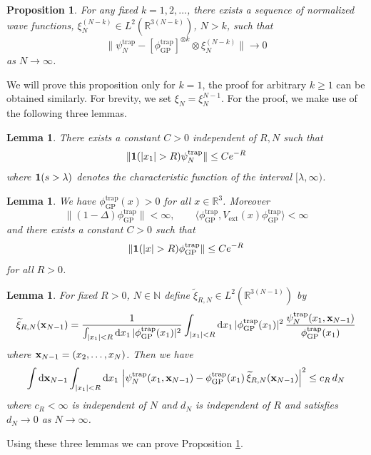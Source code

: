 \documentclass[11pt]{article}
\newtheorem{proposition}[theorem]{Proposition}
\newtheorem{lemma}[theorem]{Lemma}
\newcommand{\rd}{{\rm d}}
\newcommand{\Vtrap}{V_{\text{ext}}}
\newcommand{\psitrap}{\psi_N^{\text{trap}}}
\newcommand{\phitrap}{\phi_{\text{GP}}^{\text{trap}}}
\newcommand{\bx}{{\bf x}}
\newcommand{\bR}{{\mathbb R}}
\newcommand{\bN}{{\mathbb N}}
\newcommand{\wt}{\widetilde}
\begin{document}
\begin{proposition}\label{prop:C1} For any fixed $k=1,2,\ldots $,
there exists a sequence of normalized wave functions,
$\xi_N^{(N-k)} \in L^2 (\bR^{3(N-k)})$,  $N> k$, such that
\[ \big\| \psitrap - [\phitrap]^{\otimes k} \otimes \xi_N^{(N-k)}
 \big\| \to 0 \] as $N \to
\infty$.
\end{proposition}

We will prove this proposition only for $k=1$, the proof
for arbitrary $k\ge 1$ can be obtained similarly. For brevity,
we set $\xi_N= \xi_N^{N-1}$.
For the proof, we make use of the following three lemmas.

\begin{lemma}\label{lm:C1}
There exists a constant $C >0$ independent of $R,N$ such that
\begin{equation}
\| {\bf 1}(|x_1| > R ) \psitrap \| \leq C e^{-R}
\end{equation}
where ${\bf 1} (s > \lambda)$ denotes the characteristic function of
the interval $[\lambda , \infty)$.
\end{lemma}

\begin{lemma}\label{lm:C2}
We have $\phitrap (x) > 0$ for all $x \in \bR^3$. Moreover
\[ \| (1 -\Delta) \phitrap \| < \infty , \qquad  \langle \phitrap, \Vtrap (x) \phitrap \rangle
< \infty \] and there exists a constant $C>0$ such that
\[ \| {\bf 1} (|x| > R ) \phitrap \| \leq C e^{-R} \] for all $R >0$.
\end{lemma}

\begin{lemma}\label{lm:C3}
For fixed $R>0$, $N \in \bN$ define $\wt\xi_{R,N} \in L^2
(\bR^{3(N-1)})$ by
\[ \wt\xi_{R,N} (\bx_{N-1}) = \frac{1}{\int_{|x_1| < R} \rd
x_1 \, |\phitrap (x_1)|^2} \int_{|x_1| < R} \rd x_1 \, |\phitrap
(x_1)|^2 \, \frac{\psitrap (x_1, \bx_{N-1})}{\phitrap (x_1)} \]
where $\bx_{N-1} = (x_2, \dots ,x_N)$. Then we have
\begin{equation}
\int \rd \bx_{N-1} \int_{|x_1| <R} \rd x_1 \, \left| \psitrap (x_1,
\bx_{N-1}) - \phitrap (x_1)\,  \wt \xi_{R,N} (\bx_{N-1}) \right|^2
\leq c_R \, d_N
\end{equation}
where $c_R < \infty$ is independent of $N$ and $d_N$ is independent
of $R$ and satisfies $d_N \to 0$ as $N \to \infty$.
\end{lemma}

Using these three lemmas we can prove Proposition \ref{prop:C1}.
\end{document}
